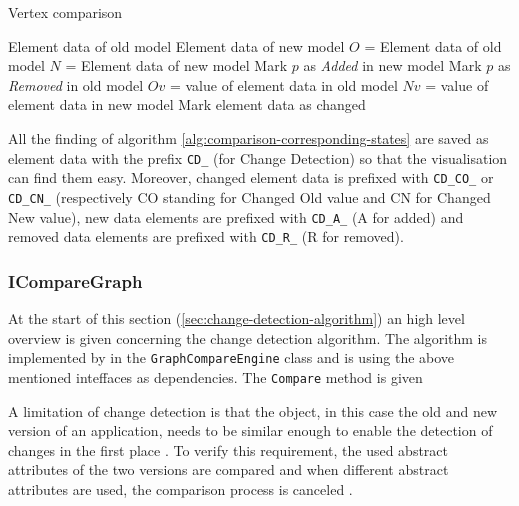 \begin{algorithm}
    \caption{Vertex comparison}\label{alg:comparison-corresponding-states}
    \begin{algorithmic}
        \Require Element data of old model
        \Require Element data of new model
        \State $O$ = Element data of old model
        \State $N$ = Element data of new model
            \State Mark $p$ as \textit{Added} in new model
        \EndFor
            \State Mark $p$ as \textit{Removed} in old model
        \EndFor
            \State $Ov$ = value of element data in old model
            \State $Nv$ = value of element data in new model
               \State Mark element data as changed 
            \EndIf
        \EndFor
    \end{algorithmic}
\end{algorithm}

All the finding of algorithm \ref{alg:comparison-corresponding-states} are saved as element data with the prefix \verb|CD_| (for Change Detection) so that the visualisation can find them easy. Moreover, changed element data is prefixed with \verb|CD_CO_| or \verb|CD_CN_| (respectively CO standing for Changed Old value and CN for Changed New value), new data elements are prefixed with \verb|CD_A_| (A for added) and removed data elements are prefixed with \verb|CD_R_| (R for removed).

\subsubsection{ICompareGraph} \label{sec:compare-algorithm}
At the start of this section (\ref{sec:change-detection-algorithm}) an high level overview is given concerning the change detection algorithm. The algorithm is implemented by in the \verb|GraphCompareEngine| class and is using the above mentioned inteffaces as dependencies. The \verb|Compare| method is given 

A limitation of change detection is that the object, in this case the old and new version of an application, needs to be similar enough to enable the detection of changes in the first place \cite{andrews2009visual}. To verify this requirement, the used abstract attributes of the two versions are compared and when different abstract attributes are used, the comparison process is canceled \cite{stateDiff}. 


